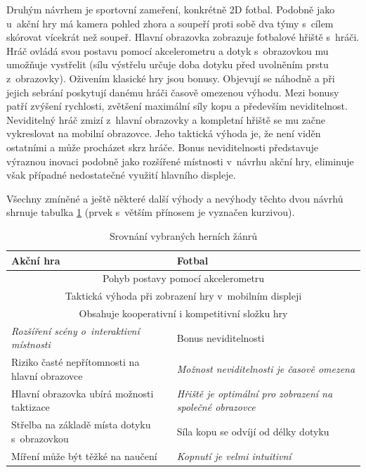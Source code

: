 \documentclass[thesis=B,czech,hidelinks]{FITthesis}[2012/06/26] %
\begin{document}
Druhým návrhem je sportovní zameření, konkrétně 2D fotbal. Podobně jako u~akční hry má kamera pohled zhora a soupeří proti sobě dva týmy s~cílem skórovat vícekrát než soupeř. Hlavní obrazovka zobrazuje fotbalové hřiště s~hráči. Hráč ovládá svou postavu pomocí akcelerometru a dotyk s~obrazovkou mu umožňuje vystřelit (sílu výstřelu určuje doba dotyku před uvolněním prstu z~obrazovky). Oživením klasické hry jsou bonusy. Objevují se náhodně a při jejich sebrání poskytují danému hráči časově omezenou výhodu. Mezi bonusy patří zvýšení rychlosti, zvětšení maximální síly kopu a především neviditelnost. Neviditelný hráč zmizí z~hlavní obrazovky a kompletní hřiště se mu začne vykreslovat na mobilní obrazovce. Jeho taktická výhoda je, že není viděn ostatními a může procházet skrz hráče. Bonus neviditelnosti představuje výraznou inovaci podobně jako rozšířené místnosti v~návrhu akční hry, eliminuje však případné nedostatečné využití hlavního displeje.

Všechny zmíněné a ještě některé další výhody a nevýhody těchto dvou návrhů shrnuje tabulka \ref{table:game_comparison} (prvek s~větším přínosem je vyznačen kurzivou).

\begin{table}[h]
\caption{Srovnání vybraných herních žánrů}
\label{table:game_comparison}
\begin{tabularx}{\textwidth}{|X|X|}
\hline
\textbf{Akční hra} & \textbf{Fotbal} \\ \hline
\multicolumn{2}{|c|}{Pohyb postavy pomocí akcelerometru}\\ \hline
\multicolumn{2}{|c|}{Taktická výhoda při zobrazení hry v~mobilním displeji}\\ \hline
\multicolumn{2}{|c|}{Obsahuje kooperativní i kompetitivní složku hry}\\ \hline
\emph{Rozšíření scény o~interaktivní místnosti} & Bonus neviditelnosti \\ \hline
Riziko časté nepřítomnosti na hlavní obrazovce & \emph{Možnost neviditelnosti je časově omezena} \\ \hline
Hlavní obrazovka ubírá možnosti taktizace & \emph{Hřiště je optimální pro zobrazení na společné obrazovce} \\ \hline

Střelba na základě místa dotyku s~obrazovkou & Síla kopu se odvíjí od délky dotyku \\ \hline
Míření může být těžké na naučení & \emph{Kopnutí je velmi intuitivní} \\ \hline
\end{tabularx}
\end{table}
\end{document}
